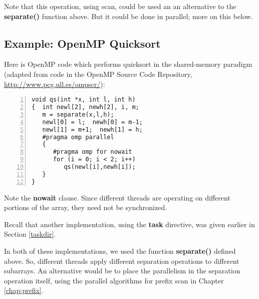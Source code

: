 Note that this operation, using scan, could be used an an alternative to
the {\bf separate()} function above.  But it could be done in parallel;
more on this below.

\subsection{Example: OpenMP Quicksort}
\label{sharedqs}

Here is OpenMP code which performs quicksort in the shared-memory
paradigm (adapted from code in the OpenMP Source Code Repository,
\url{http://www.pcg.ull.es/ompscr/}):

\begin{Verbatim}[fontsize=\relsize{-2},numbers=left]
void qs(int *x, int l, int h)
{  int newl[2], newh[2], i, m;
   m = separate(x,l,h);
   newl[0] = l;  newh[0] = m-1;
   newl[1] = m+1;  newh[1] = h;
   #pragma omp parallel
   {
      #pragma omp for nowait
      for (i = 0; i < 2; i++)
         qs(newl[i],newh[i]);
   }
}
\end{Verbatim}

Note the {\bf nowait} clause.  Since different threads are operating on
different portions of the array, they need not be synchronized.

Recall that another implementation, using the {\bf task} directive, was
given earlier in Section \ref{taskdir}.

In both of these implementations, we used the function {\bf separate()}
defined above.  So, different threads apply different separation
operations to different subarrays.  An alternative would be to place the
parallelism in the separation operation itself, using the parallel
algorithms for prefix scan in Chapter \ref{chap:prefix}.


% 
% 

